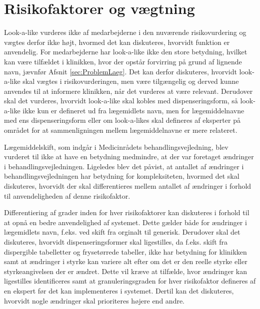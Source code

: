 \section{Risikofaktorer og vægtning}
Look-a-like vurderes ikke af medarbejderne i den nuværende risikovurdering og vægtes derfor ikke højt, hvormed det kan diskuteres, hvorvidt funktion er anvendelig. For medarbejderne har look-a-like ikke den store betydning, hvilket kan være tilfældet i klinikken, hvor der opstår forvirring på grund af lignende navn, jævnfør Afsnit \ref{sec:ProblemLaeg}. Det kan derfor diskuteres, hvorvidt look-a-like skal vægtes i risikovurderingen, men være tilgængelig og derved kunne anvendes til at informere klinikken, når det vurderes at være relevant. Derudover skal det vurderes, hvorvidt look-a-like skal kobles med dispenseringsform, så look-a-like ikke kun er defineret ud fra lægemidlets navn, men for lægemiddelnavne med ens dispenseringsform eller om look-a-likes skal defineres af eksperter på området for at sammenligningen mellem lægemiddelnavne er mere relateret.

Lægemiddelskift, som indgår i Medicinrådets behandlingsvejledning, blev vurderet til ikke at have en betydning medmindre, at der var foretaget ændringer i behandlingsvejledningen. Ligeledes blev det påvist, at antallet af ændringer i behandlingsvejledningen har betydning for kompleksiteten, hvormed det skal diskuteres, hvorvidt der skal differentieres mellem antallet af ændringer i forhold til anvendeligheden af denne risikofaktor. 

Differentiering af grader inden for hver risikofaktorer kan diskuteres i forhold til at opnå en bedre anvendelighed af systemet. Dette gælder både for ændringer i lægemidlets navn, f.eks. ved skift fra orginalt til generisk. Derudover skal det diskuteres, hvorvidt dispenseringsformer skal ligestilles, da f.eks. skift fra dispergible tabelletter og frysetørrede tabeller, ikke har betydning for klinikken samt at ændringer i styrke kan variere alt efter om det er den reelle styrke eller styrkeangivelsen der er ændret. Dette vil kræve at tilfælde, hvor ændringer kan ligestilles identificeres samt at granuleringsgraden for hver risikofaktor defineres af en ekspert før det kan implementeres i systemet. Dertil kan det diskuteres, hvorvidt nogle ændringer skal prioriteres højere end andre.

